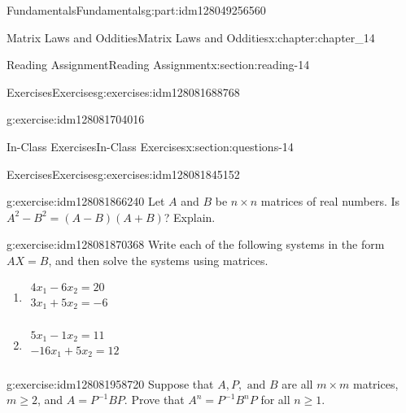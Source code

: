 \documentclass[oneside,10pt,]{book}
\numberwithin{equation}{section}
\begin{document}
\begin{partptx}{Fundamentals}{}{Fundamentals}{}{}{g:part:idm128049256560}
\begin{chapterptx}{Matrix Laws and Oddities}{}{Matrix Laws and Oddities}{}{}{x:chapter:chapter_14}
\begin{sectionptx}{Reading Assignment}{}{Reading Assignment}{}{}{x:section:reading-14}
\begin{exercises-subsection}{Exercises}{}{Exercises}{}{}{g:exercises:idm128081688768}
\begin{exercisegroup}
\begin{divisionexerciseeg}{2}{}{}{g:exercise:idm128081704016}
\end{divisionexerciseeg}%
\end{exercisegroup}
\par\medskip\noindent
\end{exercises-subsection}
\end{sectionptx}
%
%
\typeout{************************************************}
\typeout{************************************************}
%
\begin{sectionptx}{In-Class Exercises}{}{In-Class Exercises}{}{}{x:section:questions-14}
%
%
%
\typeout{************************************************}
\typeout{************************************************}
%
\begin{exercises-subsection}{Exercises}{}{Exercises}{}{}{g:exercises:idm128081845152}
\par\medskip\noindent%
%
\begin{exercisegroup}
\begin{divisionexerciseeg}{1}{}{}{g:exercise:idm128081866240}%
Let \(A\) and \(B\) be \(n\times n\) matrices of real numbers. Is \(A^2-B^2= (A-B)(A+B)\)?  Explain.%
\end{divisionexerciseeg}%
\begin{divisionexerciseeg}{2}{}{}{g:exercise:idm128081870368}%
Write each of the following systems in the form \(A X = B\), and then solve the systems using matrices.%
\par
%
\begin{multicols}{2}
\begin{enumerate}[label=(\alph*)]
\item{}\(\displaystyle \begin{array}{c}4x_1-6x_2=20\\
3x_1+5x_2= -6\\
\end{array}\)%
\item{}\(\displaystyle \begin{array}{c}5x_1-1x_2= 11\\
-16x_1 +5x_2= 12\\
\end{array}\)%
\end{enumerate}
\end{multicols}
%
\end{divisionexerciseeg}%
\begin{divisionexerciseeg}{3}{}{}{g:exercise:idm128081958720}%
Suppose that \(A, P, \textrm{ and } B\) are all \(m \times m\) matrices, \(m \geq 2\), and \(A= P^{-1} B P\). Prove that  \(A^n = P^{-1} B^n P\) for all \(n \geq 1\).%

\end{divisionexerciseeg}
\end{exercisegroup}
\end{exercises-subsection}
\end{sectionptx}
\end{chapterptx}
\end{partptx}
\end{document}
